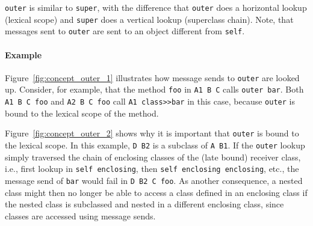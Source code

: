 \texttt{outer} is similar to \texttt{super}, with the difference that \texttt{outer} does a horizontal lookup (lexical scope) and \texttt{super} does a vertical lookup (superclass chain). Note, that messages sent to \texttt{outer} are sent to an object different from \texttt{self}.

\paragraph{Example}
Figure~\ref{fig:concept_outer_1} illustrates how message sends to \texttt{outer} are looked up. Consider, for example, that the method \texttt{foo} in \texttt{A1 B C} calls \texttt{outer bar}. Both \texttt{A1 B C foo} and \texttt{A2 B C foo} call \texttt{A1 class>>bar} in this case, because \texttt{outer} is bound to the lexical scope of the method.

Figure~\ref{fig:concept_outer_2} shows why it is important that \texttt{outer} is bound to the lexical scope. In this example, \texttt{D B2} is a subclass of \texttt{A B1}. If the \texttt{outer} lookup simply traversed the chain of enclosing classes of the (late bound) receiver class, i.e., first lookup in \texttt{self enclosing}, then \texttt{self enclosing enclosing}, etc., the message send of \texttt{bar} would fail in \texttt{D B2 C foo}. As another consequence, a nested class might then no longer be able to access a class defined in an enclosing class if the nested class is subclassed and nested in a different enclosing class, since classes are accessed using message sends.

